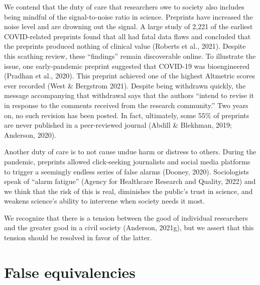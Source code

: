 \documentclass[authordate, empirical]{jote-new-article}
\begin{document}
	We contend that the duty of care that researchers owe to society also includes being mindful of the signal-to-noise ratio in science. Preprints have increased the noise level and are drowning out the signal. A large study of 2,221 of the earliest COVID-related preprints found that all had fatal data flaws and concluded that the preprints produced nothing of clinical value (Roberts et al., 2021). Despite this scathing review, these “findings” remain discoverable online. To illustrate the issue, one early-pandemic preprint suggested that COVID-19 was bioengineered (Pradhan et al., 2020). This preprint achieved one of the highest Altmetric scores ever recorded (West \& Bergstrom 2021). Despite being withdrawn quickly, the message accompanying that withdrawal says that the authors “intend to revise it in response to the comments received from the research community.” Two years on, no such revision has been posted. In fact, ultimately, some 55\% of preprints are never published in a peer-reviewed journal (Abdill \& Blekhman, 2019; Anderson, 2020).







	Another duty of care is to not cause undue harm or distress to others. During the pandemic, preprints allowed click-seeking journalists and social media platforms to trigger a seemingly endless series of false alarms (Dooney, 2020). Sociologists speak of “alarm fatigue” (Agency for Healthcare Research and Quality, 2022) and we think that the risk of this is real, diminishes the public's trust in science, and weakens science's ability to intervene when society needs it most.







	We recognize that there is a tension between the good of individual researchers and the greater good in a civil society (Anderson, 2021g), but we assert that this tension should be resolved in favor of the latter.







	\section{False equivalencies}
\end{document}
